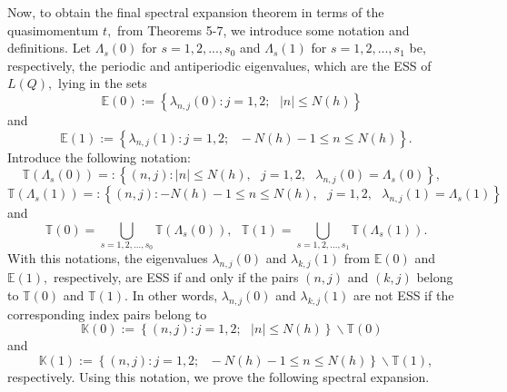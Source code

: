\documentclass{article}%
\begin{document}
Now, to obtain the final spectral expansion theorem in terms of the
quasimomentum $t,$ from Theorems 5-7, we introduce some notation and
definitions. Let $\Lambda_{s}(0)$ for $s=1,2,...,s_{0}$ and $\Lambda_{s}(1)$
for $s=1,2,...,s_{1}$ be, respectively, the periodic and antiperiodic
eigenvalues, which are the ESS of $L(Q),$ lying in the sets
\[
\mathbb{E}(0):=\left\{  \lambda_{n,j}(0):j=1,2;\text{ }\left\vert n\right\vert
\leq N(h)\right\}  \text{ }%
\]
and
\[
\mathbb{E}(1):=\left\{  \lambda_{n,j}(1):j=1,2;\text{ }-N(h)-1\leq n\leq
N(h)\right\}  .
\]
Introduce the following notation:
\[
\mathbb{T}(\Lambda_{s}(0))=:\left\{  \left(  n,j\right)  :\left\vert
n\right\vert \leq N(h),\text{ }j=1,2,\text{ }\lambda_{n,j}(0)=\Lambda
_{s}(0)\right\}  ,\text{ }%
\]%
\[
\mathbb{T}(\Lambda_{s}(1))=:\left\{  \left(  n,j\right)  :-N(h)-1\leq n\leq
N(h),\text{ }j=1,2,\text{ }\lambda_{n,j}(1)=\Lambda_{s}(1)\right\}
\]
and
\[
\mathbb{T}(0)\mathbb{=}%
{\textstyle\bigcup\limits_{s=1,2,...,s_{0}}}
\mathbb{T}(\Lambda_{s}(0)),\text{ }\mathbb{T}(1)\mathbb{=}%
{\textstyle\bigcup\limits_{s=1,2,...,s_{1}}}
\mathbb{T}(\Lambda_{s}(1)).
\]
With this notations, the eigenvalues $\lambda_{n,j}(0)$ and $\lambda_{k,j}(1)$
from $\mathbb{E}(0)$ and $\mathbb{E}(1),$ respectively, are ESS if and only if
the pairs $\left(  n,j\right)  $ and $\left(  k,j\right)  $ belong to
$\mathbb{T}(0)$ and $\mathbb{T}(1).$ In other words, $\lambda_{n,j}(0)$ and
$\lambda_{k,j}(1)$ are not ESS if the corresponding index pairs belong to
\[
\mathbb{K}(0):=\left\{  \left(  n,j\right)  :j=1,2;\text{ }\left\vert
n\right\vert \leq N(h)\right\}  \backslash\mathbb{T}(0)\text{ }%
\]
and
\[
\mathbb{K}(1):=\left\{  \left(  n,j\right)  :j=1,2;\text{ }-N(h)-1\leq n\leq
N(h)\right\}  \backslash\mathbb{T}(1),
\]
respectively. Using this notation, we prove the following spectral expansion.
\end{document}
